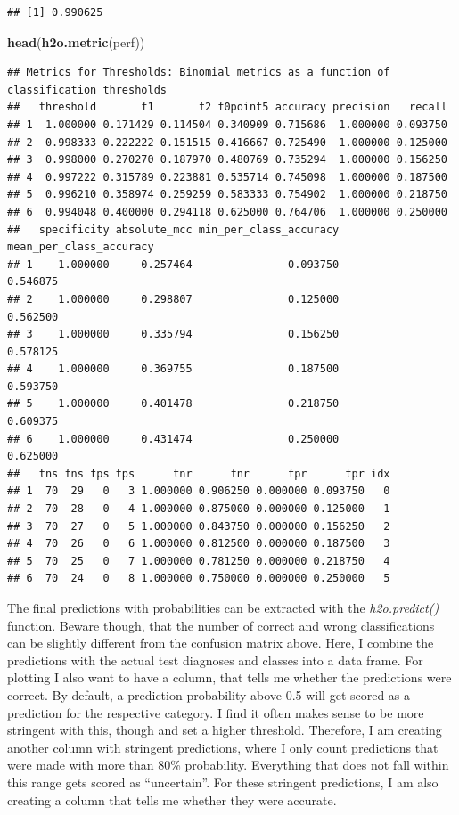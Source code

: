 \documentclass[]{article}
\newenvironment{Shaded}{\begin{snugshade}}{\end{snugshade}}
\newcommand{\KeywordTok}[1]{\textcolor[rgb]{0.13,0.29,0.53}{\textbf{{#1}}}}
\newcommand{\NormalTok}[1]{{#1}}
\begin{document}
\begin{verbatim}
## [1] 0.990625
\end{verbatim}

\begin{Shaded}
\begin{Highlighting}[]
\KeywordTok{head}\NormalTok{(}\KeywordTok{h2o.metric}\NormalTok{(perf))}
\end{Highlighting}
\end{Shaded}

\begin{verbatim}
## Metrics for Thresholds: Binomial metrics as a function of classification thresholds
##   threshold       f1       f2 f0point5 accuracy precision   recall
## 1  1.000000 0.171429 0.114504 0.340909 0.715686  1.000000 0.093750
## 2  0.998333 0.222222 0.151515 0.416667 0.725490  1.000000 0.125000
## 3  0.998000 0.270270 0.187970 0.480769 0.735294  1.000000 0.156250
## 4  0.997222 0.315789 0.223881 0.535714 0.745098  1.000000 0.187500
## 5  0.996210 0.358974 0.259259 0.583333 0.754902  1.000000 0.218750
## 6  0.994048 0.400000 0.294118 0.625000 0.764706  1.000000 0.250000
##   specificity absolute_mcc min_per_class_accuracy mean_per_class_accuracy
## 1    1.000000     0.257464               0.093750                0.546875
## 2    1.000000     0.298807               0.125000                0.562500
## 3    1.000000     0.335794               0.156250                0.578125
## 4    1.000000     0.369755               0.187500                0.593750
## 5    1.000000     0.401478               0.218750                0.609375
## 6    1.000000     0.431474               0.250000                0.625000
##   tns fns fps tps      tnr      fnr      fpr      tpr idx
## 1  70  29   0   3 1.000000 0.906250 0.000000 0.093750   0
## 2  70  28   0   4 1.000000 0.875000 0.000000 0.125000   1
## 3  70  27   0   5 1.000000 0.843750 0.000000 0.156250   2
## 4  70  26   0   6 1.000000 0.812500 0.000000 0.187500   3
## 5  70  25   0   7 1.000000 0.781250 0.000000 0.218750   4
## 6  70  24   0   8 1.000000 0.750000 0.000000 0.250000   5
\end{verbatim}

The final predictions with probabilities can be extracted with the
\emph{h2o.predict()} function. Beware though, that the number of correct
and wrong classifications can be slightly different from the confusion
matrix above. Here, I combine the predictions with the actual test
diagnoses and classes into a data frame. For plotting I also want to
have a column, that tells me whether the predictions were correct. By
default, a prediction probability above 0.5 will get scored as a
prediction for the respective category. I find it often makes sense to
be more stringent with this, though and set a higher threshold.
Therefore, I am creating another column with stringent predictions,
where I only count predictions that were made with more than 80\%
probability. Everything that does not fall within this range gets scored
as ``uncertain''. For these stringent predictions, I am also creating a
column that tells me whether they were accurate.
\end{document}
